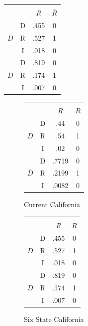 \documentclass[12pt]{article}
\begin{document}
 \begin{center}
\begin{tabular}{| c | c | c | c |} \hline
         &  &     &           \\
         &  & $R$ & $\overline{R}$ \\ \hline
                &D &.455 &  0     \\
$D$           &R &.527 &  1     \\
                &I &.018  & 0      \\ \hline
                &D &.819 &  0    \\
$\overline{D}$&R &.174 &  1     \\
                &I &.007 & 0     \\ \hline
\end{tabular}
\end{center}

\begin{figure}
\begin{center}
\begin{tabular}{| c | c | c | c |} \hline
         &  &     &           \\
         &  & $R$ & $\overline{R}$ \\ \hline
                &D &.44 &  0     \\
$D$           &R &.54 &  1     \\
                &I &.02  & 0      \\ \hline
                &D &.7719 &  0    \\
$\overline{D}$&R &.2199 &  1     \\
                &I &.0082 & 0     \\ \hline
\end{tabular}
    \caption{Current California \label{overflow}}
\end{center}
\end{figure}
\begin{figure}
\begin{center}
\begin{tabular}{| c | c | c | c |} \hline
         &  &     &           \\
         &  & $R$ & $\overline{R}$ \\ \hline
                &D &.455 &  0     \\
$D$           &R &.527 &  1     \\
                &I &.018  & 0      \\ \hline
                &D &.819 &  0    \\
$\overline{D}$&R &.174 &  1     \\
                &I &.007 & 0     \\ \hline
\end{tabular}
    \caption{Six State California \label{overflow}}
\end{center}
\end{figure}
\end{document}
